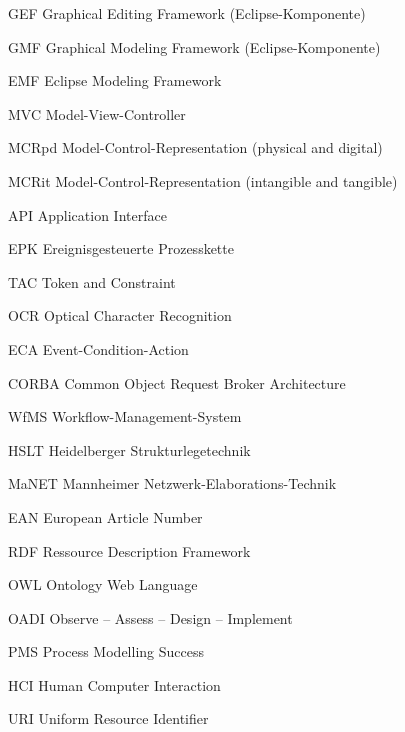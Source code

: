 {GEF}
{Graphical Editing Framework (Eclipse-Komponente)}

{GMF}
{Graphical Modeling Framework (Eclipse-Komponente)}

{EMF}
{Eclipse Modeling Framework}

{MVC}
{Model-View-Controller}

{MCRpd}
{Model-Control-Representation (physical and digital)}

{MCRit}
{Model-Control-Representation (intangible and tangible)}

{API}
{Application Interface}

{EPK}
{Ereignisgesteuerte Prozesskette}

{TAC}
{Token and Constraint}

{OCR}
{Optical Character Recognition}

{ECA}
{Event-Condition-Action}

{CORBA}
{Common Object Request Broker Architecture}

{WfMS}
{Workflow-Management-System}

{HSLT}
{Heidelberger Strukturlegetechnik}

{MaNET}
{Mannheimer Netzwerk-Elaborations-Technik}

{EAN}
{European Article Number}

{RDF}
{Ressource Description Framework}

{OWL}
{Ontology Web Language}

{OADI}
{Observe -- Assess -- Design -- Implement}

{PMS}
{Process Modelling Success}

{HCI}
{Human Computer Interaction}

{URI}
{Uniform Resource Identifier}
